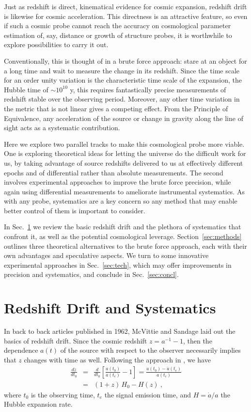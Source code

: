 \documentclass[preprint]{aastex}
\newcommand{\bea}{\begin{eqnarray}}
\newcommand{\eea}{\end{eqnarray}}
\begin{document}
Just as redshift is direct, kinematical evidence for cosmic expansion, 
redshift drift is likewise for cosmic acceleration.  This directness is 
an attractive feature, so even if such a cosmic probe cannot reach the 
accuracy on cosmological parameter estimation of, say, distance or growth 
of structure probes, it is worthwhile to explore possibilities to carry 
it out. 

Conventionally, this is thought of in a brute force approach: stare at an 
object for a long time and wait to measure the change in its redshift.  
Since the time scale for an order unity variation is the characteristic 
time scale of the expansion, the Hubble time of $\sim10^{10}$ y, this 
requires fantastically precise measurements of redshift stable over the 
observing period.  Moreover, any other time variation in the metric that 
is not linear gives a competing effect.  From the Principle of Equivalence, 
any acceleration of the source or change in gravity along the line of sight 
acts as a systematic contribution. 

Here we explore two parallel tracks to make this cosmological probe more 
viable. One is exploring theoretical ideas for letting the universe do the 
difficult work for us, by taking advantage of source redshifts delivered 
to us at effectively different epochs and of differential rather than absolute 
measurements.  The second involves experimental approaches to improve the 
brute force precision, while again using differential measurements to 
ameliorate instrumental systematics. As with any probe, systematics are a 
key concern so any method that may enable better control of them is 
important to consider. 

In Sec.~\ref{sec:basic} we review the basic redshift drift and the plethora 
of systematics that confront it, as well as the potential cosmological 
leverage.  Section~\ref{sec:methods} outlines three theoretical 
alternatives to the brute force approach, each with their own advantages 
and speculative aspects. 
We turn to some innovative experimental approaches in Sec.~\ref{sec:tech}, 
which may offer improvements in precision and systematics, and conclude in 
Sec.~\ref{sec:concl}. 


\section{Redshift Drift and Systematics} \label{sec:basic} 

In back to back articles published in 1962, McVittie \cite{mcvittie} and 
Sandage \cite{sandage} laid out the basics of redshift drift.  Since the 
cosmic redshift $z=a^{-1}-1$, then the dependence $a(t)$ of the source with 
respect to the observer necessarily implies that $z$ changes with time as 
well. Following the approach in \cite{fpoc}, we have 
\bea 
\frac{dz}{dt_0}&=&\frac{d}{dt_0}\left[\frac{a(t_0)}{a(t_e)}-1\right] 
=\frac{\dot a(t_0)-\dot a (t_e)}{a(t_e)}\\ 
&=&(1+z)\,H_0-H(z)\ , 
\eea 
where $t_0$ is the observing time, $t_e$ the signal emission time, and 
$H=\dot a/a$ the Hubble expansion rate.  
\end{document}
